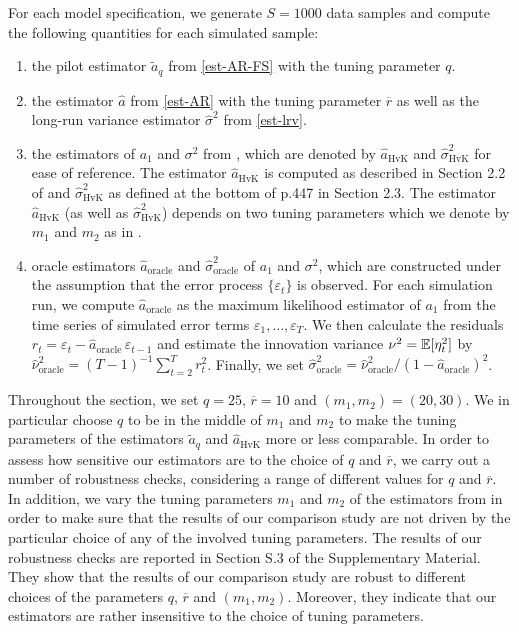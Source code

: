 For each model specification, we generate $S=1000$ data samples and compute the following quantities for each simulated sample: 
\begin{enumerate}[label=(\roman*),leftmargin=0.9cm]
\item the pilot estimator $\widetilde{a}_q$ from \eqref{est-AR-FS} with the tuning parameter $q$.
\item the estimator $\widehat{a}$ from \eqref{est-AR} with the tuning parameter $\overline{r}$ as well as the long-run variance estimator $\widehat{\sigma}^2$ from \eqref{est-lrv}. 
\item the estimators of $a_1$ and $\sigma^2$ from \cite{Hall2003}, which are denoted by $\widehat{a}_{\text{HvK}}$ and $\widehat{\sigma}^2_{\text{HvK}}$ for ease of reference. The estimator $\widehat{a}_{\text{HvK}}$ is computed as described in Section 2.2 of \cite{Hall2003} and $\widehat{\sigma}^2_{\text{HvK}}$ as defined at the bottom of p.447 in Section 2.3. The estimator $\widehat{a}_{\text{HvK}}$ (as well as $\widehat{\sigma}^2_{\text{HvK}}$) depends on two tuning parameters which we denote by $m_1$ and $m_2$ as in \cite{Hall2003}. 
\item oracle estimators $\widehat{a}_{\text{oracle}}$ and $\widehat{\sigma}^2_{\text{oracle}}$ of $a_1$ and $\sigma^2$, which are constructed under the assumption that the error process $\{\varepsilon_t\}$ is observed. For each simulation run, we compute $\widehat{a}_{\text{oracle}}$ as the maximum likelihood estimator of $a_1$ from the time series of simulated error terms $\varepsilon_1,\ldots,\varepsilon_T$. We then calculate the residuals $r_t = \varepsilon_t - \widehat{a}_{\text{oracle}} \, \varepsilon_{t-1}$ and estimate the innovation variance $\nu^2 = \mathbb{E}[\eta_t^2]$ by $\widehat{\nu}_{\text{oracle}}^2 = (T-1)^{-1} \sum_{t=2}^T r_t^2$. Finally, we set $\widehat{\sigma}^2_{\text{oracle}} = \widehat{\nu}_{\text{oracle}}^2 / (1 - \widehat{a}_{\text{oracle}})^2$. 
\end{enumerate}
Throughout the section, we set $q = 25$, $\overline{r} = 10$ and $(m_1,m_2) = (20,30)$. We in particular choose $q$ to be in the middle of $m_1$ and $m_2$ to make the tuning parameters of the estimators $\widetilde{a}_q$ and $\widehat{a}_{\text{HvK}}$ more or less comparable. In order to assess how sensitive our estimators are to the choice of $q$ and $\overline{r}$, we carry out a number of robustness checks, considering a range of different values for $q$ and $\overline{r}$. In addition, we vary the tuning parameters $m_1$ and $m_2$ of the estimators from \cite{Hall2003} in order to make sure that the results of our comparison study are not driven by the particular choice of any of the involved tuning parameters. The results of our robustness checks are reported in Section S.3 of the Supplementary Material. They show that the results of our comparison study are robust to %
different choices of the parameters $q$, $\overline{r}$ and $(m_1,m_2)$. Moreover, they indicate that our estimators are rather insensitive to the choice of tuning parameters. 


